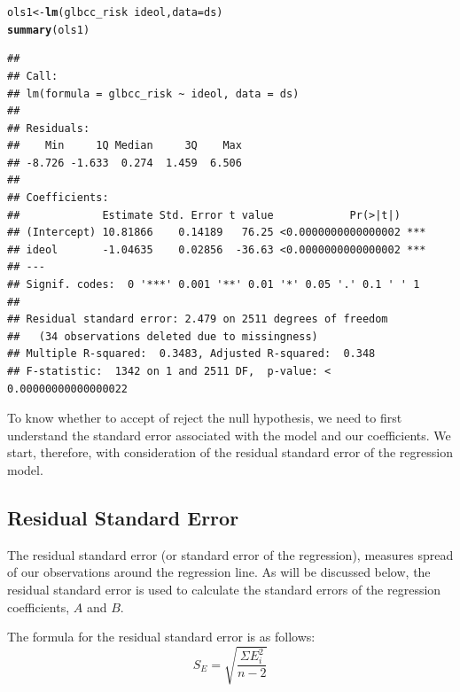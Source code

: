 \documentclass[11pt,openany]{book}\usepackage[]{graphicx}\usepackage[]{color}
\makeatletter
\newcommand{\hlopt}[1]{\textcolor[rgb]{0,0,0}{#1}}%
\newcommand{\hlstd}[1]{\textcolor[rgb]{0.345,0.345,0.345}{#1}}%
\newcommand{\hlkwb}[1]{\textcolor[rgb]{0.69,0.353,0.396}{#1}}%
\newcommand{\hlkwc}[1]{\textcolor[rgb]{0.333,0.667,0.333}{#1}}%
\newcommand{\hlkwd}[1]{\textcolor[rgb]{0.737,0.353,0.396}{\textbf{#1}}}%
\newenvironment{kframe}{%
 \def\at@end@of@kframe{}%
 \ifinner\ifhmode%
  \def\at@end@of@kframe{\end{minipage}}%
  \begin{minipage}{\columnwidth}%
 \fi\fi%
 \def\FrameCommand##1{\hskip\@totalleftmargin \hskip-\fboxsep
 \colorbox{shadecolor}{##1}\hskip-\fboxsep
     \hskip-\linewidth \hskip-\@totalleftmargin \hskip\columnwidth}%
 \MakeFramed {\advance\hsize-\width
   \@totalleftmargin\z@ \linewidth\hsize
   \@setminipage}}%
 {\par\unskip\endMakeFramed%
 \at@end@of@kframe}
\newenvironment{knitrout}{}{} %
\renewenvironment{knitrout}{\begin{singlespace}}{\end{singlespace}} %
\makeatother
\begin{document}
\begin{knitrout}
\color{fgcolor}\begin{kframe}
\begin{alltt}
\hlstd{ols1} \hlkwb{<-} \hlkwd{lm}\hlstd{(glbcc_risk} \hlopt{~} \hlstd{ideol,} \hlkwc{data} \hlstd{= ds)}
\hlkwd{summary}\hlstd{(ols1)}
\end{alltt}
\begin{verbatim}
## 
## Call:
## lm(formula = glbcc_risk ~ ideol, data = ds)
## 
## Residuals:
##    Min     1Q Median     3Q    Max 
## -8.726 -1.633  0.274  1.459  6.506 
## 
## Coefficients:
##             Estimate Std. Error t value            Pr(>|t|)    
## (Intercept) 10.81866    0.14189   76.25 <0.0000000000000002 ***
## ideol       -1.04635    0.02856  -36.63 <0.0000000000000002 ***
## ---
## Signif. codes:  0 '***' 0.001 '**' 0.01 '*' 0.05 '.' 0.1 ' ' 1
## 
## Residual standard error: 2.479 on 2511 degrees of freedom
##   (34 observations deleted due to missingness)
## Multiple R-squared:  0.3483,	Adjusted R-squared:  0.348 
## F-statistic:  1342 on 1 and 2511 DF,  p-value: < 0.00000000000000022
\end{verbatim}
\end{kframe}
\end{knitrout}

To know whether to accept of reject the null hypothesis, we need to first understand the standard error associated with the model and our coefficients. We start, therefore, with  consideration of the residual standard error of the regression model. 

\subsection{Residual Standard Error} 

The residual standard error (or standard error of the regression),  measures spread of our observations around the regression line. As will be discussed below, the residual standard error is used to calculate the standard errors of the regression coefficients, $A$ and $B$. 

The formula for the residual standard error is as follows:
\begin{equation}
S_{E}=\sqrt{\frac{\Sigma E^{2}_{i}}{n-2}}
\end{equation}
\end{document}
